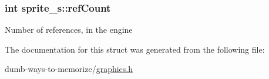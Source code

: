 \subsubsection[{\texorpdfstring{ref\+Count}{refCount}}]{\setlength{\rightskip}{0pt plus 5cm}int sprite\+\_\+s\+::ref\+Count}\hypertarget{structsprite__s_a7d4ba5f7754122c2c538e9e0a2ec2b09}{}\label{structsprite__s_a7d4ba5f7754122c2c538e9e0a2ec2b09}
Number of references, in the engine 

The documentation for this struct was generated from the following file\+:\begin{DoxyCompactItemize}
\item 
dumb-\/ways-\/to-\/memorize/\hyperlink{graphics_8h}{graphics.\+h}\end{DoxyCompactItemize}
